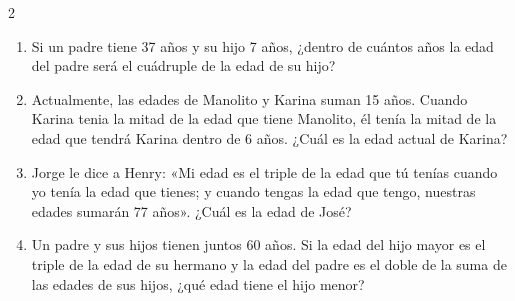 \documentclass[10pt]{article}
\begin{document}
\begin{multicols}{2}
\begin{enumerate}[label=\textbf{\arabic*.}, itemsep=0.4cm]
			\item Si un padre tiene 37 años y su hijo 7 años, ¿dentro de cuántos años la edad del padre será el cuádruple de la edad de su hijo?

			\item Actualmente, las edades de Manolito y Karina suman 15 años. Cuando Karina tenia la mitad de la edad que tiene Manolito, él tenía la mitad de la edad que tendrá Karina dentro de 6 años. ¿Cuál es la edad actual de Karina?

			\item Jorge le dice a Henry: «Mi edad es el triple de la edad que tú tenías cuando yo tenía la edad que
			tienes; y cuando tengas la edad que tengo, nuestras edades sumarán 77 años». ¿Cuál es la edad de José?

			\item Un padre y sus hijos tienen juntos 60 años. Si la edad del hijo mayor es el triple de la edad de su hermano y la edad del padre es el doble de la suma de las edades de sus hijos, ¿qué edad tiene el hijo menor?


		\end{enumerate}

\end{multicols}
\end{document}
